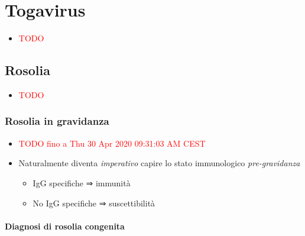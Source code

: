 \documentclass[italian,]{article}
\providecommand{\tightlist}{%
  \setlength{\itemsep}{0pt}\setlength{\parskip}{0pt}}
\newcommand{\TODO}[1]{\textcolor{red}{\textsf{\footnotesize{TODO #1}}}} %
\begin{document}
\hypertarget{togavirus}{%
\section{Togavirus}\label{togavirus}}

\begin{itemize}
\item
  \TODO{}
\end{itemize}

\hypertarget{rosolia}{%
\subsection{Rosolia}\label{rosolia}}

\begin{itemize}
\item
  \TODO{}
\end{itemize}

\hypertarget{rosolia-in-gravidanza}{%
\subsubsection{Rosolia in gravidanza}\label{rosolia-in-gravidanza}}

\begin{itemize}
\item
  \TODO{fino a Thu 30 Apr 2020 09:31:03 AM CEST }
\item
  Naturalmente diventa \emph{imperativo} capire lo stato immunologico
  \emph{pre-gravidanza}

  \begin{itemize}
  \tightlist
  \item
    IgG specifiche ⇒ immunità
  \item
    No IgG specifiche ⇒ suscettibilità
  \end{itemize}
\end{itemize}

\hypertarget{diagnosi-di-rosolia-congenita}{%
\paragraph{Diagnosi di rosolia
congenita}\label{diagnosi-di-rosolia-congenita}}
\end{document}
